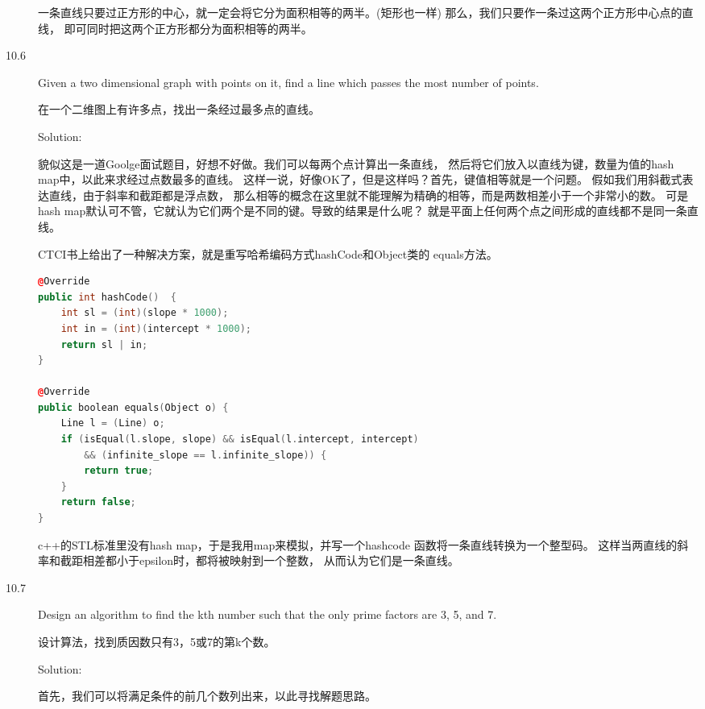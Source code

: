 \begin{description}
一条直线只要过正方形的中心，就一定会将它分为面积相等的两半。(矩形也一样) 那么，我们只要作一条过这两个正方形中心点的直线， 即可同时把这两个正方形都分为面积相等的两半。


\item[10.6] Given a two dimensional graph with points on it, find a line which passes the most number of points.

在一个二维图上有许多点，找出一条经过最多点的直线。

Solution: 

貌似这是一道Goolge面试题目，好想不好做。我们可以每两个点计算出一条直线， 然后将它们放入以直线为键，数量为值的hash map中，以此来求经过点数最多的直线。 这样一说，好像OK了，但是这样吗？首先，键值相等就是一个问题。 假如我们用斜截式表达直线，由于斜率和截距都是浮点数， 那么相等的概念在这里就不能理解为精确的相等，而是两数相差小于一个非常小的数。 可是hash map默认可不管，它就认为它们两个是不同的键。导致的结果是什么呢？ 就是平面上任何两个点之间形成的直线都不是同一条直线。

CTCI书上给出了一种解决方案，就是重写哈希编码方式hashCode和Object类的 equals方法。
\begin{lstlisting}[language=C++]
@Override  
public int hashCode()  {
    int sl = (int)(slope * 1000);
    int in = (int)(intercept * 1000);
    return sl | in;
} 

@Override  
public boolean equals(Object o) {  
    Line l = (Line) o;
    if (isEqual(l.slope, slope) && isEqual(l.intercept, intercept) 
        && (infinite_slope == l.infinite_slope)) {
        return true;
    }
    return false;
}      
\end{lstlisting}
c++的STL标准里没有hash map，于是我用map来模拟，并写一个hashcode 函数将一条直线转换为一个整型码。 这样当两直线的斜率和截距相差都小于epsilon时，都将被映射到一个整数， 从而认为它们是一条直线。



\item[10.7] Design an algorithm to find the kth number such that the only prime factors are 3, 5, and 7.

设计算法，找到质因数只有3，5或7的第k个数。

Solution: 

首先，我们可以将满足条件的前几个数列出来，以此寻找解题思路。


\end{description}
